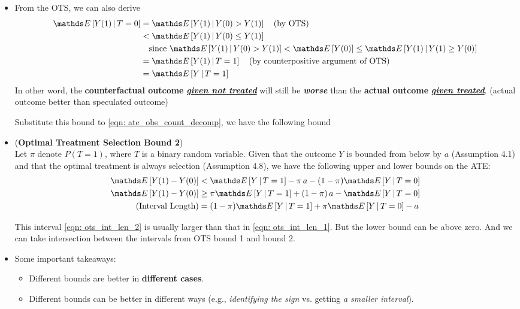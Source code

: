 \documentclass[11pt]{article}
\begin{document}
\begin{itemize}
\item From the OTS, we can also derive
\begin{align}
\E{}{Y(1) \,|\, T = 0} &= \E{}{Y(1)\, |\, Y(0) > Y(1)} \quad (\text{by OTS}) \nonumber\\
&  <  \E{}{Y(1)\, |\, Y(0) \le Y(1)} \nonumber\\
& \quad \text{since }  \E{}{Y(1)\, |\, Y(0) > Y(1)} < \E{}{Y(0)} \le \E{}{Y(1)\, |\, Y(1) \ge Y(0) } \nonumber\\
&= \E{}{Y(1)\, |\, T = 1}   \quad (\text{by counterpositive argument of OTS}) \nonumber\\
&= \E{}{Y\, |\, T = 1} \label{eqn: ots_counter_upper_bound}
\end{align} In other word, the \textbf{counterfactual outcome} \underline{\emph{\textbf{given not treated}}} will still be \emph{\textbf{worse}} than the \textbf{actual outcome} \underline{\emph{\textbf{given treated}}}. (actual outcome better than speculated outcome)

Substitute this bound to \eqref{eqn: ate_obs_count_decomp}, we have the following bound

\item \begin{proposition} (\textbf{Optimal Treatment Selection Bound 2}) \citep{neal2020introduction} \\
Let $\pi$ denote $P(T = 1)$, where $T$ is a binary random variable. Given that the outcome $Y$ is bounded from below by $a$ (Assumption 4.1) and that the optimal treatment is always selection (Assumption 4.8), we have the following upper and lower bounds on the ATE:
\begin{align}
\E{}{Y(1) - Y(0)}  &< \E{}{Y \,|\, T=1} - \pi \,a - (1-\pi) \E{}{Y\,|\, T=0} \label{eqn: ots_upper_bound_2} \\
\E{}{Y(1) - Y(0)}  &\ge \pi \E{}{Y \,|\, T=1}+ (1-\pi)\,a -  \E{}{Y \,|\, T=0}  \label{eqn: ots_lower_bound_2} \\
(\text{Interval Length}) &= (1-\pi) \E{}{Y \,|\, T=1} + \pi \E{}{Y \,|\, T=0} - a \label{eqn: ots_int_len_2}
\end{align}
\end{proposition}

This interval \eqref{eqn: ots_int_len_2} is usually larger than that in \eqref{eqn: ots_int_len_1}. But the lower bound can be above zero. And we can take intersection between the intervals from OTS bound 1 and bound 2.

\item Some important takeaways:
\begin{itemize}
\item Different bounds are better in \textbf{different cases}.
\item Different bounds can be better in different ways (e.g., \emph{identifying the sign} vs. getting \emph{a smaller interval}).
\end{itemize}

\end{itemize}
\end{document}
